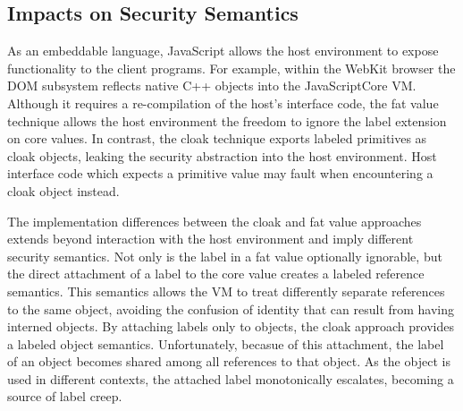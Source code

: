 \subsection{Impacts on Security Semantics}

As an embeddable language, JavaScript allows the host environment to expose functionality to the client programs.
For example, within the WebKit browser the DOM subsystem reflects native C++ objects into the JavaScriptCore VM.
Although it requires a re-compilation of the host's interface code, the fat value technique allows the host environment the freedom to ignore the label extension on core values.
In contrast, the cloak technique exports labeled primitives as cloak objects, leaking the security abstraction into the host environment.
Host interface code which expects a primitive value may fault when encountering a cloak object instead.

The implementation differences between the cloak and fat value approaches extends beyond interaction with the host environment and imply different security semantics.
Not only is the label in a fat value optionally ignorable, but the direct attachment of a label to the core value creates a labeled reference semantics.
This semantics allows the VM to treat differently separate references to the same object, avoiding the confusion of identity that can result from having interned objects.
By attaching labels only to objects, the cloak approach provides a labeled object semantics.
Unfortunately, becasue of this attachment, the label of an object becomes shared among all references to that object.
As the object is used in different contexts, the attached label monotonically escalates, becoming a source of label creep.

\medskip
\begin{figure}[h]
\centering
{}
\end{figure}
\medskip

